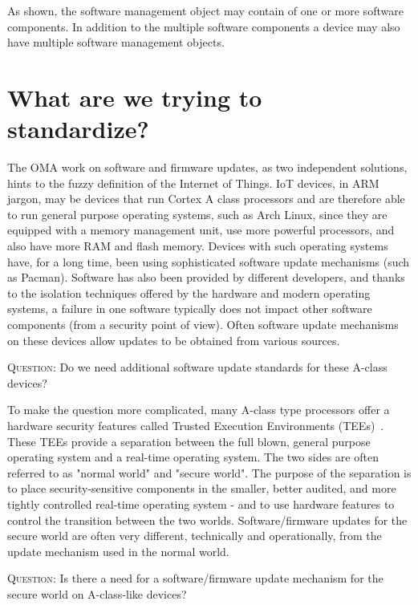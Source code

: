 \documentclass[peerreview, a4paper, 7pt]{IEEEtran}
\begin{document}
As shown, the software management object may contain of one or more software components. In addition to the multiple software components a device may also have multiple software management objects. 

\section{What are we trying to standardize?}
\label{what}

The OMA work on software and firmware updates, as two independent solutions, hints to the fuzzy definition of the Internet of Things. IoT devices, in ARM jargon, may be devices that run Cortex A class processors and are therefore able to run general purpose operating systems, such as Arch Linux, since they are equipped with a memory management unit, use more powerful processors, and also have more RAM and flash memory. Devices with such operating systems have, for a long time, been using sophisticated software update mechanisms (such as Pacman). Software has also been provided by different developers, and thanks to the isolation techniques offered by the hardware and modern operating systems, a failure in one software typically does not impact other software components (from a security point of view). Often software update mechanisms on these devices allow updates to be obtained from various sources. 

\textsc{Question}: Do we need additional software update standards for these A-class devices?

To make the question more complicated, many A-class type processors offer a hardware security features called Trusted Execution Environments (TEEs)~\cite{TEE}. These TEEs provide a separation between the full blown, general purpose operating system and a real-time operating system. The two sides are often referred to as "normal world" and "secure world". The purpose of the separation is to place security-sensitive components in the smaller, better audited, and more tightly controlled real-time operating system - and to use hardware features to control the transition between the two worlds. Software/firmware updates for the secure world are often very different, technically and operationally, from the update mechanism used in the normal world.

\textsc{Question}: Is there a need for a software/firmware update mechanism for the secure world on A-class-like devices? 
\end{document}
